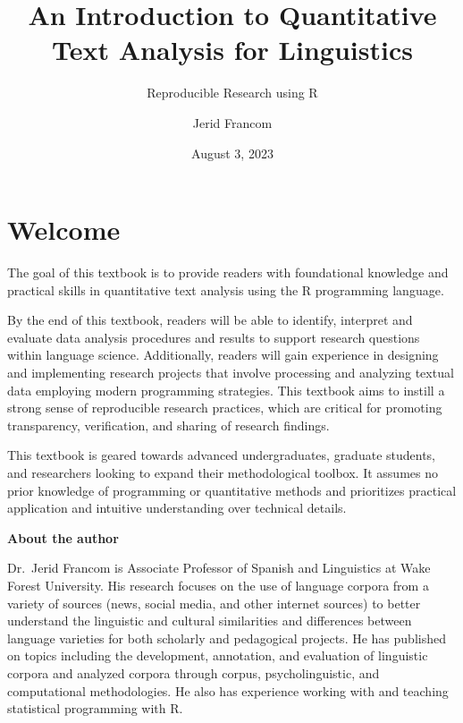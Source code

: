 \documentclass[
  letterpaper,
  DIV=11,
  numbers=noendperiod]{scrreport}
\title{An Introduction to Quantitative Text Analysis for Linguistics}
\subtitle{Reproducible Research using R}
\author{Jerid Francom}
\date{August 3, 2023}
\renewcommand*\contentsname{Table of contents}
\newcommand\contentsname{Table of contents}
\theoremstyle{definition}
\theoremstyle{remark}
\begin{document}
\maketitle
\ifdefined\Shaded\renewenvironment{Shaded}{\begin{tcolorbox}[breakable, boxrule=0pt, colback={codebgcolor}, borderline west={3pt}{0pt}{shadecolor}, sharp corners, frame hidden, enhanced]}{\end{tcolorbox}}\fi

\renewcommand*\contentsname{Table of contents}
{
\setcounter{tocdepth}{2}
\tableofcontents
}

\hypertarget{welcome}{%
\chapter*{Welcome}\label{welcome}}


The goal of this textbook is to provide readers with foundational
knowledge and practical skills in quantitative text analysis using the R
programming language.

By the end of this textbook, readers will be able to identify, interpret
and evaluate data analysis procedures and results to support research
questions within language science. Additionally, readers will gain
experience in designing and implementing research projects that involve
processing and analyzing textual data employing modern programming
strategies. This textbook aims to instill a strong sense of reproducible
research practices, which are critical for promoting transparency,
verification, and sharing of research findings.

This textbook is geared towards advanced undergraduates, graduate
students, and researchers looking to expand their methodological
toolbox. It assumes no prior knowledge of programming or quantitative
methods and prioritizes practical application and intuitive
understanding over technical details.

\textbf{About the author}

Dr.~Jerid Francom is Associate Professor of Spanish and Linguistics at
Wake Forest University. His research focuses on the use of language
corpora from a variety of sources (news, social media, and other
internet sources) to better understand the linguistic and cultural
similarities and differences between language varieties for both
scholarly and pedagogical projects. He has published on topics including
the development, annotation, and evaluation of linguistic corpora and
analyzed corpora through corpus, psycholinguistic, and computational
methodologies. He also has experience working with and teaching
statistical programming with R.
\end{document}
